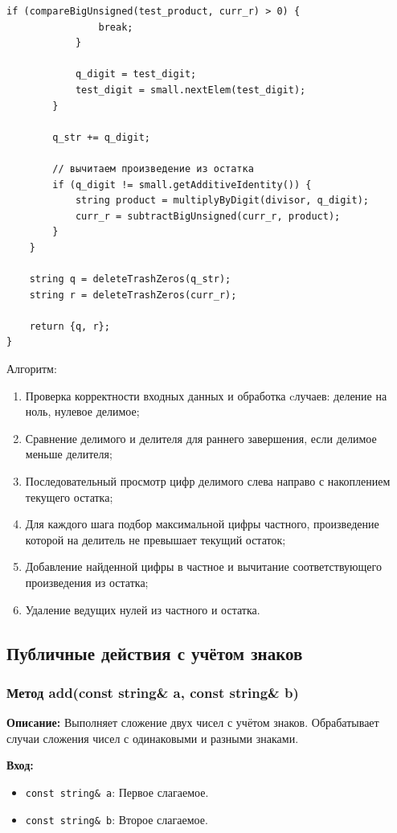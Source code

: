 \begin{lstlisting}[style=cstyle, caption={Реализация divideBigUnsigned()}]
            if (compareBigUnsigned(test_product, curr_r) > 0) {
                break;
            }
            
            q_digit = test_digit;
            test_digit = small.nextElem(test_digit);
        }
        
        q_str += q_digit;
        
        // вычитаем произведение из остатка
        if (q_digit != small.getAdditiveIdentity()) {
            string product = multiplyByDigit(divisor, q_digit);
            curr_r = subtractBigUnsigned(curr_r, product);
        }
    }
    
    string q = deleteTrashZeros(q_str);
    string r = deleteTrashZeros(curr_r);
    
    return {q, r};
}

\end{lstlisting}

Алгоритм:
\begin{enumerate}
\item Проверка корректности входных данных и обработка cлучаев: деление на ноль, нулевое делимое;
\item Сравнение делимого и делителя для раннего завершения, если делимое меньше делителя;
\item Последовательный просмотр цифр делимого слева направо с накоплением текущего остатка;
\item Для каждого шага подбор максимальной цифры частного, произведение которой на делитель не превышает текущий остаток;
\item Добавление найденной цифры в частное и вычитание соответствующего произведения из остатка;
\item Удаление ведущих нулей из частного и остатка.
\end{enumerate}

\subsection*{Публичные действия с учётом знаков}

\subsubsection{Метод add(const string\& a, const string\& b)}

\textbf{Описание: } Выполняет сложение двух чисел с учётом знаков. Обрабатывает случаи сложения чисел с одинаковыми и разными знаками.

\textbf{Вход: }
\begin{itemize}
    \item \texttt{const string\& a}: Первое слагаемое. 
    \item \texttt{const string\& b}: Второе слагаемое.
\end{itemize}

